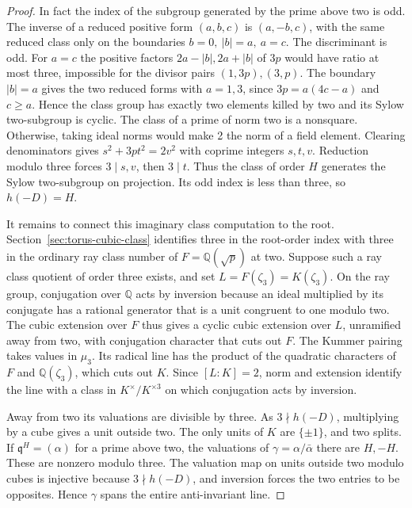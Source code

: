 \documentclass[11pt]{article}
\begin{document}
\begin{proof}
In fact the index of the subgroup generated by the prime above two
is odd. The inverse of a reduced positive form \((a,b,c)\) is
\((a,-b,c)\), with the same reduced class only on the boundaries
\(b=0,\ |b|=a,\ a=c\). The discriminant is odd. For \(a=c\) the
positive factors \(2a-|b|,2a+|b|\) of \(3p\) would have ratio at
most three, impossible for the divisor pairs \((1,3p),(3,p)\).
The boundary \(|b|=a\) gives the two reduced forms with \(a=1,3\),
since \(3p=a(4c-a)\) and \(c\ge a\). Hence the class group has
exactly two elements killed by two and its Sylow two-subgroup is
cyclic. The class of a prime of norm two is a nonsquare. Otherwise,
taking ideal norms would make 2 the norm of a field element.
Clearing denominators gives \(s^2+3p t^2=2v^2\) with coprime
integers \(s,t,v\). Reduction modulo three forces \(3\mid s,v\),
then \(3\mid t\). Thus the class of order \(H\) generates the
Sylow two-subgroup on projection. Its odd index is less than three,
so \(h(-D)=H\).

It remains to connect this imaginary class computation to the root.
Section~\ref{sec:torus-cubic-class} identifies three in the root-order
index with three in the ordinary ray class number of
\(F=\mathbb Q(\sqrt p)\) at two. Suppose such a ray class quotient
of order three exists, and set \(L=F(\zeta_3)=K(\zeta_3)\). On the
ray group, conjugation over \(\mathbb Q\) acts by inversion because
an ideal multiplied by its conjugate has a rational generator that
is a unit congruent to one modulo two. The cubic extension over
\(F\) thus gives a cyclic cubic extension over \(L\), unramified
away from two, with conjugation character that cuts out \(F\).
The Kummer pairing takes values in \(\mu_3\). Its radical line
has the product of the quadratic characters of \(F\) and
\(\mathbb Q(\zeta_3)\), which cuts out \(K\). Since \([L:K]=2\),
norm and extension identify the line with a class in
\(K^\times/K^{\times3}\) on which conjugation acts by inversion.

Away from two its valuations are divisible by three. As \(3\nmid
h(-D)\), multiplying by a cube gives a unit outside two. The only
units of \(K\) are \(\{\pm1\}\), and two splits. If
\(\mathfrak q^H=(\alpha)\) for a prime above two, the valuations of
\(\gamma=\alpha/\bar\alpha\) there are \(H,-H\). These are nonzero
modulo three. The valuation map on units outside two modulo cubes
is injective because \(3\nmid h(-D)\), and inversion forces the
two entries to be opposites. Hence \(\gamma\) spans the entire
anti-invariant line.


\end{proof}
\end{document}
